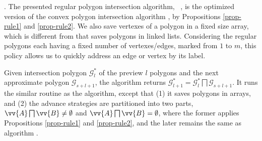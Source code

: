 .
The presented regular polygon intersection algorithm, \ie\ \rpia, is the optimized version  of the convex polygon intersection algorithm \cpia, by Propositions \ref{prop-rule1} and \ref{prop-rule2}. We also save vertexes of a polygon in a fixed size array, which is different from \cpia  that saves polygons in linked lists.
Considering the regular polygons each having a fixed number of vertexes/edges, marked from $1$ to $m$, this policy allows us to quickly address an edge or vertex by its label.

Given intersection polygon $\mathcal{G}^*_{l}$ of the preview $l$ polygons and the next approximate polygon $\mathcal{G}_{s+l+1}$, the algorithm \rpia returns $\mathcal{G}^*_{l+1}=\mathcal{G}^*_{l}  \bigsqcap \mathcal{G}_{s+l+1}$.
It runs the similar routine as the \cpia algorithm, except that (1) it saves polygons in arrays, and (2) the advance strategies are partitioned into two parts, \ie $\vv{A} \bigsqcap \vv{B} \ne \emptyset$ and $\vv{A} \bigsqcap \vv{B} = \emptyset$, where the former applies Propositions \ref{prop-rule1} and \ref{prop-rule2}, and the later remains the same as algorithm \cpia.





